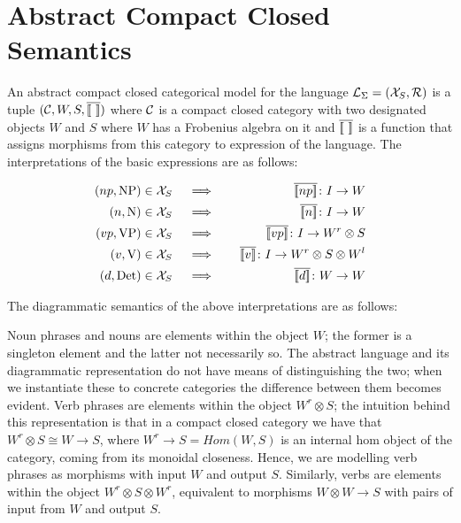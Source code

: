 \section{Abstract Compact Closed Semantics}


An abstract compact closed categorical model for the language  ${\cal L}_{\Sigma} = ({\cal X}_S, {\cal R})$  is  a tuple $({\cal C}, W,S, \overline{[\![ \  ]\!]})$ where  ${\cal C}$  is a compact closed category  with two designated objects $W$ and $S$ where  $W$ has a Frobenius algebra on it and $\overline{[\![ \  ]\!]}$ is a function that   assigns  morphisms from this category to  expression of the language. The interpretations of  the basic expressions  are as follows:

\begin{eqnarray*}
(np, \text{NP}) \in {\cal X}_S   &\quad \implies \quad& \overline{\semantics{np}} \colon I \to W \\
(n, \text{N}) \in {\cal X}_S   &\quad \implies \quad& \overline{\semantics{n}} \colon I \to W \\
(vp,  \text{VP}) \in {\cal X}_S &\quad \implies \quad& \overline{\semantics{vp}}   \colon I \to W^r \otimes S \\
(v, \text{V}) \in {\cal X}_S &\quad \implies \quad& \overline{\semantics{v}}  \colon I \to W^r \otimes S \otimes W^l  \\
(d, \text{Det}) \in  {\cal X}_S & \quad \implies \quad & \overline{\semantics{d}} \colon W \to W
\end{eqnarray*}

\noindent
The diagrammatic semantics of the above interpretations are as follows:

\begin{center}
 \qquad {} \qquad {}
\end{center}

\noindent
Noun phrases and nouns are elements  within the  object $W$; the former is a singleton element and the latter not necessarily so.  The abstract language and its diagrammatic representation do not have means of distinguishing the two;  when we instantiate these to concrete categories the difference between them becomes evident. Verb phrases are elements within the object $W^r \otimes S$; the intuition behind this representation is that in a compact closed category we have that $W^r \otimes S \cong W \to S$, where $W^r \to S = Hom(W,S)$ is an internal hom object of the category, coming from its monoidal closeness.  Hence,  we are modelling verb phrases as morphisms  with  input $W$ and  output $S$. Similarly, verbs are elements within the object $W^r \otimes S \otimes W^r$, equivalent to morphisms $W \otimes W \to S$ with pairs of  input  from $W$ and output  $S$. 


